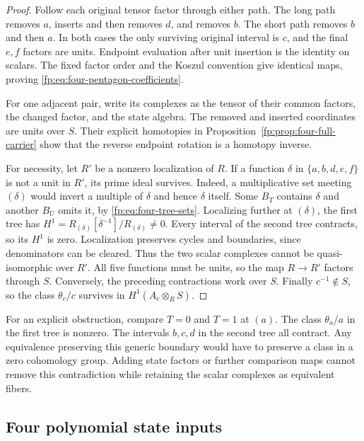 \begin{proof}
Follow each original tensor factor through either path.  The long
path removes \(a\), inserts and then removes \(d\), and removes
\(b\).  The short path removes \(b\) and then \(a\).
In both cases the only surviving original interval is \(c\), and
the final \(e,f\) factors are units.  Endpoint evaluation after
unit insertion is the identity on scalars.  The fixed factor order
and the Koszul convention give identical maps, proving
\eqref{fp:eq:four-pentagon-coefficients}.

For one adjacent pair, write its complexes as the tensor of their
common factors, the changed factor, and the state algebra.  The
removed and inserted coordinates are units over \(S\).
Their explicit homotopies in Proposition~\ref{fp:prop:four-full-carrier}
show that the reverse endpoint rotation is a homotopy inverse.

For necessity, let \(R'\) be a nonzero localization of \(R\).
If a function \(\delta\) in \(\{a,b,d,e,f\}\) is not a unit
in \(R'\), its prime ideal survives.  Indeed, a multiplicative
set meeting \((\delta)\) would invert a multiple of \(\delta\)
and hence \(\delta\) itself.  Some \(B_T\) contains \(\delta\)
and another \(B_U\) omits it, by \eqref{fp:eq:four-tree-sets}.
Localizing further at \((\delta)\), the first tree has
\(H^1=R_{(\delta)}[\delta^{-1}]/R_{(\delta)}\ne0\).
Every interval of the second tree contracts, so its \(H^1\) is zero.
Localization preserves cycles and boundaries, since denominators
can be cleared.  Thus the two scalar complexes cannot be
quasi-isomorphic over \(R'\).  All five functions must be units,
so the map \(R\to R'\) factors through \(S\).
Conversely, the preceding contractions work over \(S\).
Finally \(c^{-1}\notin S\), so the class
\(\theta_c/c\) survives in \(H^1(A_c\otimes_R S)\).
\end{proof}

For an explicit obstruction, compare \(T=0\) and \(T=1\)
at \((a)\).  The class \(\theta_a/a\) in the first tree
is nonzero.  The intervals \(b,c,d\) in the second tree
all contract.  Any equivalence preserving this generic boundary
would have to preserve a class in a zero cohomology group.
Adding state factors or further comparison maps cannot remove this
contradiction while retaining the scalar complexes as equivalent fibers.

\subsection{Four polynomial state inputs}
\label{fp:sec:four-state-pentagon}

